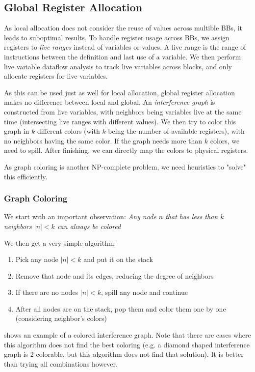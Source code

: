 \documentclass{article}
\begin{document}
\subsection{Global Register Allocation}
As local allocation does not consider the reuse of values across multible BBs, it leads to suboptimal results.
To handle register usage across BBs, we assign registers to \emph{live ranges} instead of variables or values.
A live range is the range of instructions between the definition and last use of a variable.
We then perform live variable dataflow analysis to track live variables across blocks, and only allocate registers for live variables.

As this can be used just as well for local allocation, global register allocation makes no difference between local and global.
An \emph{interference graph} is constructed from live variables, with neighbors being variables live at the same time (intersecting live ranges with different values).
We then try to color this graph in $k$ different colors (with $k$ being the number of available registers), with no neighbors having the same color.
If the graph needs more than $k$ colors, we need to spill.
After finishing, we can directly map the colors to physical registers.

As graph coloring is another NP-complete problem, we need heuristics to "solve" this efficiently.

\subsubsection{Graph Coloring}
We start with an important observation:
\emph{Any node $n$ that has less than $k$ neighbors $|n| < k$ can always be colored}

We then get a very simple algorithm:
\begin{enumerate}
	\item Pick any node $|n| < k$ and put it on the stack
	\item Remove that node and its edges, reducing the degree of neighbors
	\item If there are no nodes $|n| < k$, spill any node and continue
	\item After all nodes are on the stack, pop them and color them one by one (considering neighbor's colors)
\end{enumerate}

 shows an example of a colored interference graph.
Note that there are cases where this algorithm does not find the best coloring (e.g. a diamond shaped interference graph is 2 colorable, but this algorithm does not find that solution).
It is better than trying all combinations however.
\end{document}
